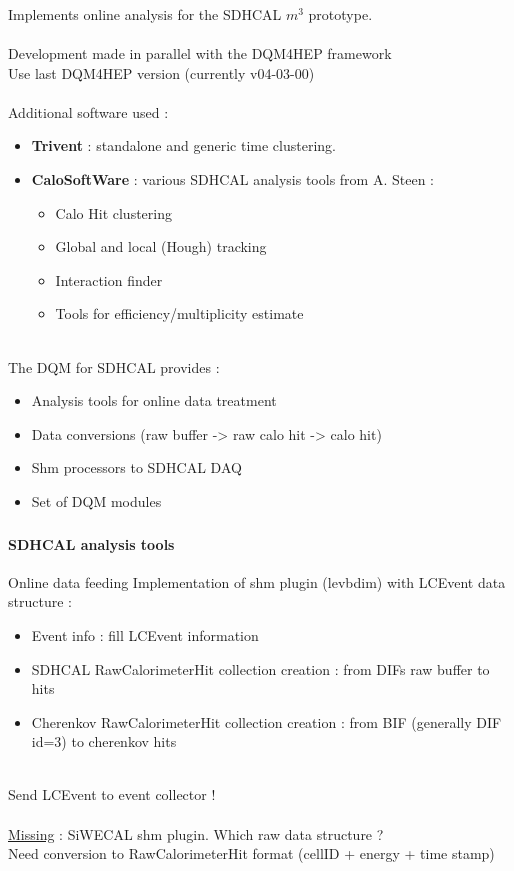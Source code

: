 \documentclass[8pt]{beamer}
\begin{document}
  \begin{frame}
    \frametitle{\secname}
    Implements online analysis for the SDHCAL $m^3$ prototype. \\
    ~ \\
    Development made in parallel with the DQM4HEP framework \\
    Use last DQM4HEP version (currently v04-03-00) \\
    ~ \\
    Additional software used : 
    \begin{itemize}
      \item \textbf{Trivent} : standalone and generic time clustering.
      \item \textbf{CaloSoftWare} : various SDHCAL analysis tools from A. Steen :
      \begin{itemize}
        \item Calo Hit clustering
        \item Global and local (Hough) tracking
        \item Interaction finder
        \item Tools for efficiency/multiplicity estimate
      \end{itemize}
    \end{itemize}
    ~ \\
    The DQM for SDHCAL provides :
    \begin{itemize}
      \item Analysis tools for online data treatment
      \item Data conversions (raw buffer -> raw calo hit -> calo hit)
      \item Shm processors to SDHCAL DAQ
      \item Set of DQM modules
    \end{itemize}
  \end{frame}
  
  
  \begin{frame}
    \frametitle{\secname}
    \framesubtitle{SDHCAL analysis tools}
    \begin{block}{Online data feeding}
    Implementation of shm plugin (levbdim) with LCEvent data structure :
      \begin{itemize}
        \item Event info : fill LCEvent information
        \item SDHCAL RawCalorimeterHit collection creation : from DIFs raw buffer to hits
        \item Cherenkov RawCalorimeterHit collection creation : from BIF (generally DIF id=3) to cherenkov hits
      \end{itemize}
    \end{block}
    ~ \\
    Send LCEvent to event collector ! \\
    ~ \\
    \underline{Missing} : SiWECAL shm plugin. Which raw data structure ? \\
    Need conversion to RawCalorimeterHit format (cellID + energy + time stamp)
  \end{frame}
  
\end{document}
